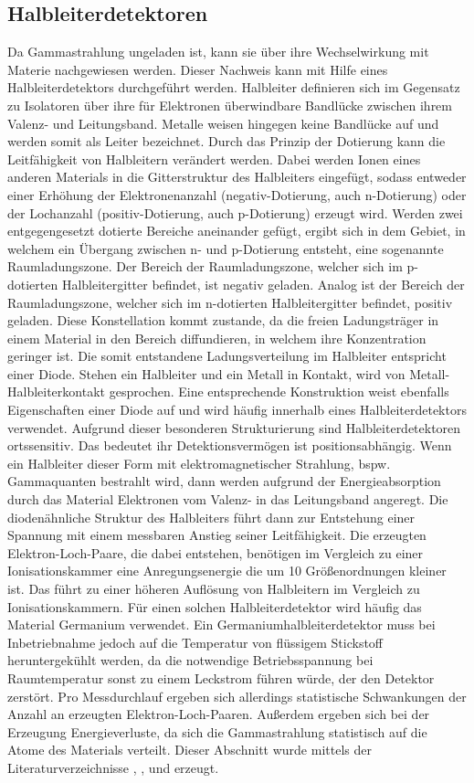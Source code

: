 \subsection{Halbleiterdetektoren}
Da Gammastrahlung ungeladen ist, kann sie über ihre Wechselwirkung mit Materie 
nachgewiesen werden. Dieser Nachweis kann mit Hilfe eines Halbleiterdetektors 
durchgeführt werden. Halbleiter definieren sich im Gegensatz zu Isolatoren über 
ihre für Elektronen überwindbare Bandlücke zwischen ihrem Valenz- und Leitungsband. 
Metalle weisen hingegen keine Bandlücke auf und werden somit als Leiter bezeichnet. 
Durch das Prinzip der Dotierung kann die Leitfähigkeit von Halbleitern verändert werden.
Dabei werden Ionen eines anderen Materials in die Gitterstruktur des Halbleiters eingefügt,
sodass entweder einer Erhöhung der Elektronenanzahl (negativ-Dotierung, auch n-Dotierung)
oder der Lochanzahl (positiv-Dotierung, auch p-Dotierung) erzeugt wird. 
Werden zwei entgegengesetzt dotierte Bereiche aneinander gefügt, ergibt sich in dem Gebiet, 
in welchem ein Übergang zwischen n- und p-Dotierung entsteht, eine sogenannte Raumladungszone.
Der Bereich der Raumladungszone, welcher sich im p-dotierten Halbleitergitter befindet, ist 
negativ geladen. Analog ist der Bereich der Raumladungszone, welcher sich im n-dotierten 
Halbleitergitter befindet, positiv geladen. Diese Konstellation kommt zustande, da die freien 
Ladungsträger in einem Material in den Bereich diffundieren, in welchem ihre Konzentration 
geringer ist. Die somit entstandene Ladungsverteilung im Halbleiter entspricht einer Diode.
Stehen ein Halbleiter und ein Metall in Kontakt, wird von Metall-Halbleiterkontakt gesprochen. 
Eine entsprechende Konstruktion weist ebenfalls Eigenschaften einer Diode auf und wird 
häufig innerhalb eines Halbleiterdetektors verwendet.
Aufgrund dieser besonderen Strukturierung sind Halbleiterdetektoren ortssensitiv. Das bedeutet 
ihr Detektionsvermögen ist positionsabhängig. 
Wenn ein Halbleiter dieser Form mit elektromagnetischer Strahlung, bspw. Gammaquanten 
bestrahlt wird, dann werden aufgrund der Energieabsorption durch das Material
Elektronen vom Valenz- in das Leitungsband angeregt. 
Die diodenähnliche Struktur des Halbleiters führt dann zur Entstehung einer
Spannung mit einem messbaren Anstieg seiner Leitfähigkeit.
Die erzeugten Elektron-Loch-Paare, die dabei entstehen, benötigen im Vergleich zu einer 
Ionisationskammer eine Anregungsenergie die um 10 Größenordnungen kleiner ist. 
Das führt zu einer höheren Auflösung von Halbleitern im Vergleich zu Ionisationskammern.
Für einen solchen Halbleiterdetektor wird häufig das Material Germanium verwendet.
Ein Germaniumhalbleiterdetektor muss bei Inbetriebnahme jedoch auf die Temperatur von 
flüssigem Stickstoff heruntergekühlt werden, da die notwendige Betriebsspannung bei 
Raumtemperatur sonst zu einem Leckstrom führen würde, der den Detektor zerstört.
Pro Messdurchlauf ergeben sich allerdings statistische Schwankungen der Anzahl an 
erzeugten Elektron-Loch-Paaren. Außerdem ergeben sich bei der Erzeugung Energieverluste,
da sich die Gammastrahlung statistisch auf die Atome des Materials verteilt.
Dieser Abschnitt wurde mittels der Literaturverzeichnisse \cite{lit1},
\cite{lit2}, \cite{lit3} und \cite{lit4} erzeugt.
